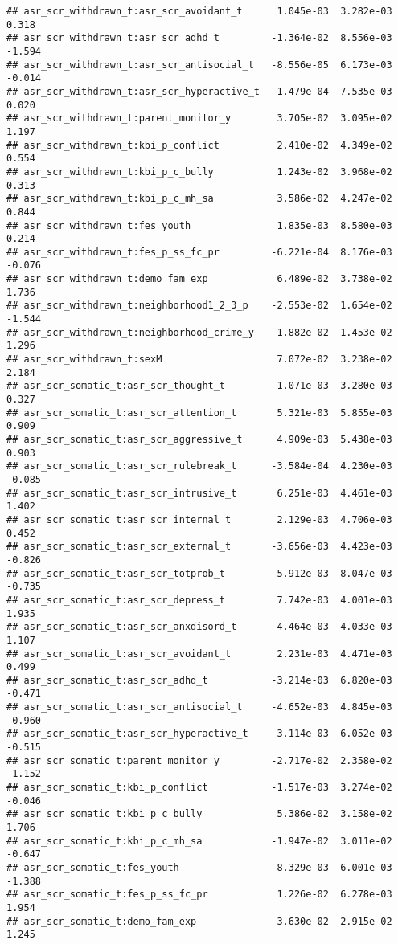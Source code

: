 \documentclass[
]{article}
\begin{document}
\begin{verbatim}
## asr_scr_withdrawn_t:asr_scr_avoidant_t      1.045e-03  3.282e-03   0.318
## asr_scr_withdrawn_t:asr_scr_adhd_t         -1.364e-02  8.556e-03  -1.594
## asr_scr_withdrawn_t:asr_scr_antisocial_t   -8.556e-05  6.173e-03  -0.014
## asr_scr_withdrawn_t:asr_scr_hyperactive_t   1.479e-04  7.535e-03   0.020
## asr_scr_withdrawn_t:parent_monitor_y        3.705e-02  3.095e-02   1.197
## asr_scr_withdrawn_t:kbi_p_conflict          2.410e-02  4.349e-02   0.554
## asr_scr_withdrawn_t:kbi_p_c_bully           1.243e-02  3.968e-02   0.313
## asr_scr_withdrawn_t:kbi_p_c_mh_sa           3.586e-02  4.247e-02   0.844
## asr_scr_withdrawn_t:fes_youth               1.835e-03  8.580e-03   0.214
## asr_scr_withdrawn_t:fes_p_ss_fc_pr         -6.221e-04  8.176e-03  -0.076
## asr_scr_withdrawn_t:demo_fam_exp            6.489e-02  3.738e-02   1.736
## asr_scr_withdrawn_t:neighborhood1_2_3_p    -2.553e-02  1.654e-02  -1.544
## asr_scr_withdrawn_t:neighborhood_crime_y    1.882e-02  1.453e-02   1.296
## asr_scr_withdrawn_t:sexM                    7.072e-02  3.238e-02   2.184
## asr_scr_somatic_t:asr_scr_thought_t         1.071e-03  3.280e-03   0.327
## asr_scr_somatic_t:asr_scr_attention_t       5.321e-03  5.855e-03   0.909
## asr_scr_somatic_t:asr_scr_aggressive_t      4.909e-03  5.438e-03   0.903
## asr_scr_somatic_t:asr_scr_rulebreak_t      -3.584e-04  4.230e-03  -0.085
## asr_scr_somatic_t:asr_scr_intrusive_t       6.251e-03  4.461e-03   1.402
## asr_scr_somatic_t:asr_scr_internal_t        2.129e-03  4.706e-03   0.452
## asr_scr_somatic_t:asr_scr_external_t       -3.656e-03  4.423e-03  -0.826
## asr_scr_somatic_t:asr_scr_totprob_t        -5.912e-03  8.047e-03  -0.735
## asr_scr_somatic_t:asr_scr_depress_t         7.742e-03  4.001e-03   1.935
## asr_scr_somatic_t:asr_scr_anxdisord_t       4.464e-03  4.033e-03   1.107
## asr_scr_somatic_t:asr_scr_avoidant_t        2.231e-03  4.471e-03   0.499
## asr_scr_somatic_t:asr_scr_adhd_t           -3.214e-03  6.820e-03  -0.471
## asr_scr_somatic_t:asr_scr_antisocial_t     -4.652e-03  4.845e-03  -0.960
## asr_scr_somatic_t:asr_scr_hyperactive_t    -3.114e-03  6.052e-03  -0.515
## asr_scr_somatic_t:parent_monitor_y         -2.717e-02  2.358e-02  -1.152
## asr_scr_somatic_t:kbi_p_conflict           -1.517e-03  3.274e-02  -0.046
## asr_scr_somatic_t:kbi_p_c_bully             5.386e-02  3.158e-02   1.706
## asr_scr_somatic_t:kbi_p_c_mh_sa            -1.947e-02  3.011e-02  -0.647
## asr_scr_somatic_t:fes_youth                -8.329e-03  6.001e-03  -1.388
## asr_scr_somatic_t:fes_p_ss_fc_pr            1.226e-02  6.278e-03   1.954
## asr_scr_somatic_t:demo_fam_exp              3.630e-02  2.915e-02   1.245

\end{verbatim}
\end{document}
